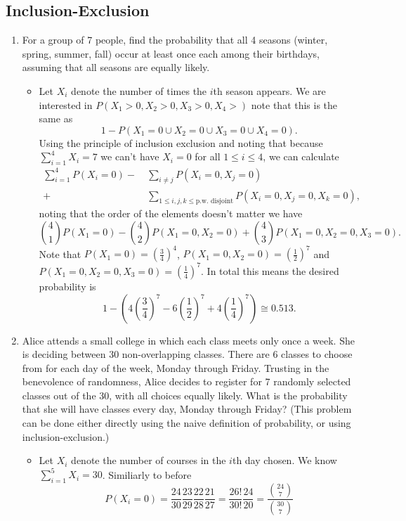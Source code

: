 \documentclass{article}
\begin{document}
\subsection{Inclusion-Exclusion}
\begin{enumerate}
	\item For a group of 7 people, find the probability that all 4 seasons (winter, spring, summer, fall) occur at least once each among their birthdays, assuming that all seasons are equally likely.
		\begin{itemize}
			\item Let $X_i$ denote the number of times the $i$th season appears. We are interested in $P(X_1 > 0, X_2 > 0, X_3 > 0, X_4 > )$ note that this is the same as
			$$
			1 - P(X_1 = 0 \cup X_2 = 0 \cup X_3 = 0 \cup X_4 = 0).
			$$
			Using the principle of inclusion exclusion and noting that because $\sum_{i = 1}^4 X_i = 7$ we can't have $X_i = 0$ for all $1 \leq i \leq 4$, we can calculate
			$$
			\begin{aligned}
			\sum_{i = 1}^4 P(X_i = 0) -&\ \sum_{i \neq j} P(X_i = 0, X_j = 0) \\
			+&\ \sum_{1 \leq i, j, k \leq \text{p.w. disjoint}} P(X_i = 0, X_j = 0, X_k = 0),
			\end{aligned}
			$$
			noting that the order of the elements doesn't matter we have
			$$
			\binom{4}{1} P(X_1 = 0) - \binom{4}{2} P(X_1 = 0, X_2 = 0) + \binom{4}{3} P(X_1 = 0, X_2 = 0, X_3 = 0).
			$$
			Note that $P(X_1 = 0) = \left(\frac{3}{4}\right)^4$, $P(X_1 = 0, X_2 = 0) = \left( \frac{1}{2} \right)^7$ and $P(X_1 = 0, X_2 = 0, X_3 = 0) = \left( \frac{1}{4} \right)^7$. In total this means the desired probability is
			$$
			1 - \left( 4 \left(\frac{3}{4}\right)^7 - 6 \left( \frac{1}{2} \right)^7 + 4 \left( \frac{1}{4} \right)^7 \right) \cong 0.513.
			$$
		\end{itemize}
	\item Alice attends a small college in which each class meets only once a week. She is deciding between 30 non-overlapping classes. There are 6 classes to choose from for each day of the week, Monday through Friday. Trusting in the benevolence of randomness, Alice decides to register for 7 randomly selected classes out of the 30, with all choices equally likely. What is the probability that she will have classes every day, Monday through Friday? (This problem can be done either directly using the naive definition of probability, or using inclusion-exclusion.)
		\begin{itemize}
			\item Let $X_i$ denote the number of courses in the $i$th day chosen. We know $\sum_{i = 1}^5 X_i = 30$. Similiarly to before
			$$
			P(X_i = 0) = \frac{24}{30} \frac{23}{29} \frac{22}{28} \frac{21}{27} = \frac{26!}{30!} \frac{24}{20} = \frac{\binom{24}{7}}{\binom{30}{7}}
			$$
		\end{itemize}
\end{enumerate}
\end{document}
